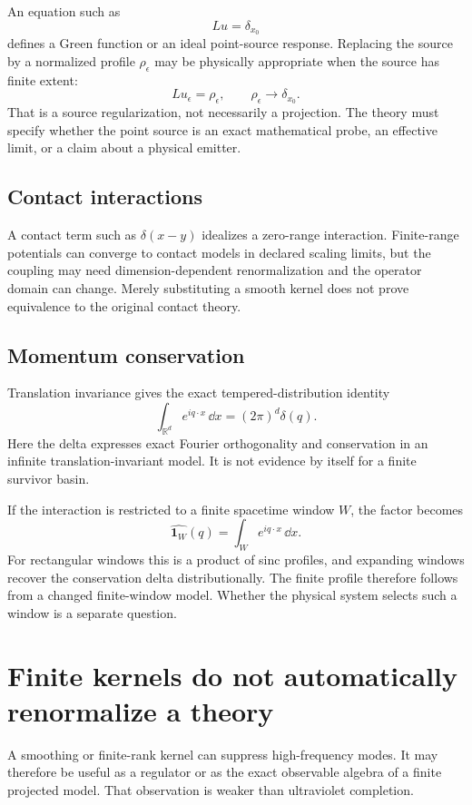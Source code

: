 \documentclass[11pt]{article}
\begin{document}
An equation such as
\[
Lu=\delta_{x_0}
\]
defines a Green function or an ideal point-source response. Replacing the
source by a normalized profile \(\rho_\epsilon\) may be physically appropriate
when the source has finite extent:
\[
Lu_\epsilon=\rho_\epsilon,
\qquad
\rho_\epsilon\longrightarrow\delta_{x_0}.
\]
That is a source regularization, not necessarily a projection. The theory
must specify whether the point source is an exact mathematical probe, an
effective limit, or a claim about a physical emitter.

\subsection{Contact interactions}

A contact term such as \(\delta(x-y)\) idealizes a zero-range interaction.
Finite-range potentials can converge to contact models in declared scaling
limits, but the coupling may need dimension-dependent renormalization and the
operator domain can change. Merely substituting a smooth kernel does not prove
equivalence to the original contact theory.

\subsection{Momentum conservation}

Translation invariance gives the exact tempered-distribution identity
\[
\int_{\mathbb R^d}e^{iq\cdot x}\,\dd x
=(2\pi)^d\delta(q).
\]
Here the delta expresses exact Fourier orthogonality and conservation in an
infinite translation-invariant model. It is not evidence by itself for a
finite survivor basin.

If the interaction is restricted to a finite spacetime window \(W\), the
factor becomes
\[
\widehat{\mathbf 1_W}(q)
=
\int_W e^{iq\cdot x}\,\dd x.
\]
For rectangular windows this is a product of sinc profiles, and expanding
windows recover the conservation delta distributionally. The finite profile
therefore follows from a changed finite-window model. Whether the physical
system selects such a window is a separate question.

\section{Finite kernels do not automatically renormalize a theory}

A smoothing or finite-rank kernel can suppress high-frequency modes. It may
therefore be useful as a regulator or as the exact observable algebra of a
finite projected model. That observation is weaker than ultraviolet
completion.
\end{document}
